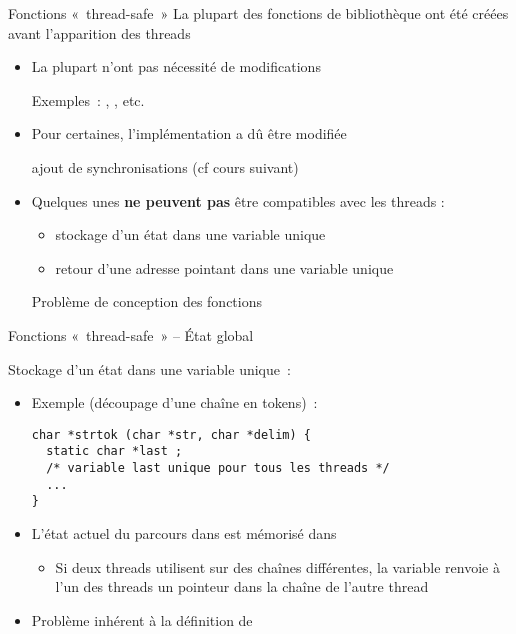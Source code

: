 \begin {frame} {Fonctions «~thread-safe~»}
    La plupart des fonctions de bibliothèque ont été créées avant
    l'apparition des threads

    \begin {itemize}
	\item La plupart n'ont pas nécessité de modifications

	    Exemples~: , , etc.

	\item Pour certaines, l'implémentation a dû être modifiée

	    \implique ajout de synchronisations
	    (cf cours suivant)

	\item Quelques unes \textbf {ne peuvent pas} être compatibles
	    avec les threads :

	    \begin {itemize}
		\item stockage d'un état dans une variable unique
		\item retour d'une adresse pointant dans une variable unique
	    \end {itemize}

	    \implique Problème de conception des fonctions

    \end {itemize}

\end {frame}

\begin {frame} [fragile] {Fonctions «~thread-safe~» -- État global}
    
    Stockage d'un état dans une variable unique~:

    \begin {itemize}
	\item Exemple (découpage d'une chaîne en tokens)~:

\begin {lstlisting}
char *strtok (char *str, char *delim) {
  static char *last ;
  /* variable last unique pour tous les threads */
  ...
}
\end{lstlisting}

	\item L'état actuel du parcours dans  est mémorisé
	    dans 

	    \begin {itemize}
		\item Si deux threads utilisent  sur
		    des chaînes différentes, la variable 
		    renvoie à l'un des threads un pointeur dans la
		    chaîne de l'autre thread

	    \end {itemize}


	\item Problème inhérent à la définition de 

    \end {itemize}
\end{frame}


